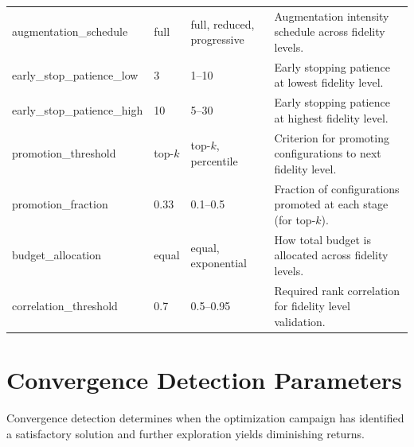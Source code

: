 \begin{longtable}{p{3.5cm}p{2cm}p{2.5cm}p{5.5cm}}
\addlinespace
augmentation\_schedule & full & full, reduced, progressive & Augmentation intensity schedule across fidelity levels. \\
\addlinespace
early\_stop\_patience\_low & 3 & 1--10 & Early stopping patience at lowest fidelity level. \\
\addlinespace
early\_stop\_patience\_high & 10 & 5--30 & Early stopping patience at highest fidelity level. \\
\addlinespace
promotion\_threshold & top-$k$ & top-$k$, percentile & Criterion for promoting configurations to next fidelity level. \\
\addlinespace
promotion\_fraction & 0.33 & 0.1--0.5 & Fraction of configurations promoted at each stage (for top-$k$). \\
\addlinespace
budget\_allocation & equal & equal, exponential & How total budget is allocated across fidelity levels. \\
\addlinespace
correlation\_threshold & 0.7 & 0.5--0.95 & Required rank correlation for fidelity level validation. \\
\end{longtable}

\section{Convergence Detection Parameters}
\label{sec:convergence_params}

Convergence detection determines when the optimization campaign has identified a satisfactory solution and further exploration yields diminishing returns.

